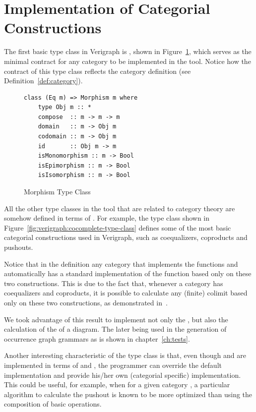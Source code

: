 \section{Implementation of Categorial Constructions}

The first basic type class in Verigraph is , shown in Figure~\ref{fig:verigraph:morphism-type-class}, which serves as the minimal contract for any category to be implemented in the tool. Notice how the contract of this type class reflects the category definition (see Definition~\ref{def:category}).

\begin{figure}[!ht]
\caption{Morphism Type Class}
\begin{verbatim}
class (Eq m) => Morphism m where
    type Obj m :: *
    compose  :: m -> m -> m
    domain   :: m -> Obj m
    codomain :: m -> Obj m
    id       :: Obj m -> m
    isMonomorphism :: m -> Bool
    isEpimorphism :: m -> Bool
    isIsomorphism :: m -> Bool
\end{verbatim}
\label{fig:verigraph:morphism-type-class}
\end{figure}

All the other type classes in the tool that are related to category theory are somehow defined in terms of . For example, the  type class shown in Figure~\ref{fig:verigraph:cocomplete-type-class} defines some of the most basic categorial constructions used in Verigraph, such as coequalizers, coproducts and pushouts.

Notice that in the  definition any category that implements the functions  and  automatically has a standard implementation of the  function based only on these two constructions. This is due to the fact that, whenever a category has coequalizers and coproducts, it is possible to calculate any (finite) colimit based only on these two constructions, as demonstrated in~\cite{Pierce1991}.

We took advantage of this result to implement not only the , but also the calculation of the  of a diagram. The later being used in the generation of occurrence graph grammars as is shown in chapter~\ref{ch:tests}.

Another interesting characteristic of the  type class is that, even though  and  are implemented in terms of  and , the programmer can override the default implementation and provide his/her own (categorial specific) implementation. This could be useful, for example, when for a given category , a particular algorithm to calculate the pushout is known to be more optimized than using the composition of basic operations.

